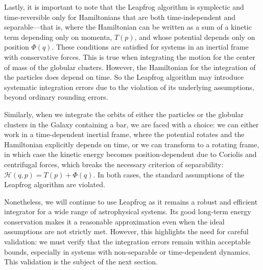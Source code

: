     Lastly, it is important to note that the Leapfrog algorithm is symplectic and time-reversible only for Hamiltonians that are both time-independent and separable—that is, where the Hamiltonian can be written as a sum of a kinetic term depending only on momenta, $T(p)$, and whose potential depends only on position $\Phi(q)$. These conditions are satisfied for systems in an inertial frame with conservative forces. This is true when integrating the motion for the center of mass of the globular clusters. However, the Hamiltonian for the integration of the particles does depend on time. So the Leapfrog algorithm may introduce systematic integration errors due to the violation of its underlying assumptions, beyond ordinary rounding errors.

    Similarly, when we integrate the orbits of either the particles or the globular clusters in the Galaxy containing a bar, we are faced with a choice: we can either work in a time-dependent inertial frame, where the potential rotates and the Hamiltonian explicitly depends on time, or we can transform to a rotating frame, in which case the kinetic energy becomes position-dependent due to Coriolis and centrifugal forces, which breaks the necessary criterion of separability: $\mathcal{H}(q,p) = T(p)+\Phi(q)$. In both cases, the standard assumptions of the Leapfrog algorithm are violated.

    Nonetheless, we will continue to use Leapfrog as it remains a robust and efficient integrator for a wide range of astrophysical systems. Its good long-term energy conservation makes it a reasonable approximation even when the ideal assumptions are not strictly met. However, this highlights the need for careful validation: we must verify that the integration errors remain within acceptable bounds, especially in systems with non-separable or time-dependent dynamics. This validation is the subject of the next section.

